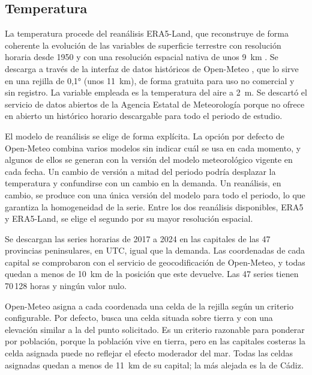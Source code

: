 \subsection{Temperatura}\label{sec:datos-temperatura}

La temperatura procede del reanálisis ERA5-Land, que reconstruye de forma
coherente la evolución de las variables de superficie terrestre con
resolución horaria desde 1950 y con una resolución espacial nativa de unos
9~km \parencite{munozsabater2021era5land}. Se descarga a través de la
interfaz de datos históricos de Open-Meteo
\parencite{zippenfenig2023openmeteo}, que lo sirve en una rejilla de 0,1°
(unos 11~km), de forma gratuita para uso no comercial y sin registro. La
variable empleada es la temperatura del aire a 2~m. Se descartó el servicio
de datos abiertos de la Agencia Estatal de Meteorología porque no ofrece en
abierto un histórico horario descargable para todo el periodo de estudio.

El modelo de reanálisis se elige de forma explícita. La opción por defecto de
Open-Meteo combina varios modelos sin indicar cuál se usa en cada momento, y
algunos de ellos se generan con la versión del modelo meteorológico vigente
en cada fecha. Un cambio de versión a mitad del periodo podría desplazar la
temperatura y confundirse con un cambio en la demanda. Un reanálisis, en
cambio, se produce con una única versión del modelo para todo el periodo, lo
que garantiza la homogeneidad de la serie. Entre los dos reanálisis
disponibles, ERA5 y ERA5-Land, se elige el segundo por su mayor resolución
espacial.

Se descargan las series horarias de 2017 a 2024 en las capitales de las 47
provincias peninsulares, en UTC, igual que la demanda. Las coordenadas de
cada capital se comprobaron con el servicio de geocodificación de
Open-Meteo, y todas quedan a menos de 10~km de la posición que este
devuelve. Las 47 series tienen 70\,128 horas y ningún valor nulo.

Open-Meteo asigna a cada coordenada una celda de la rejilla según un
criterio configurable. Por defecto, busca una celda situada sobre tierra y
con una elevación similar a la del punto solicitado. Es un criterio
razonable para ponderar por población, porque la población vive en tierra,
pero en las capitales costeras la celda asignada puede no reflejar el efecto
moderador del mar. Todas las celdas asignadas quedan a menos de 11~km de su
capital; la más alejada es la de Cádiz.

